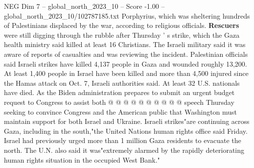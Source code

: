 \begin{textsample}{NEG Dim 7 – global\_north\_2023\_10 – Score -1.00 – global\_north\_2023\_10/102787185.txt}
Porphyrius, which was sheltering hundreds of Palestinians displaced by the war, according to religious officials. \textbf{Rescuers} were still digging through the rubble after Thursday ' s strike, which the Gaza health ministry said killed at least 16 Christians.
The Israeli military said it was aware of reports of casualties and was reviewing the incident.
Palestinian officials said Israeli strikes have killed 4,137 people in Gaza and wounded roughly 13,200.
At least 1,400 people in Israel have been killed and more than 4,500 injured since the Hamas attack on Oct. 7, Israeli authorities said.
At least 32 U.S. nationals have died.
As the Biden administration prepares to submit an urgent budget request to Congress to assist both @ @ @ @ @ @ @ @ @ @ speech Thursday seeking to convince Congress and the American public that Washington must maintain support for both Israel and Ukraine.
Israeli strikes"are continuing across Gaza, including in the south,"the United Nations human rights office said Friday.
Israel had previously urged more than 1 million Gaza residents to evacuate the north.
The U.N. also said it was"extremely alarmed by the rapidly deteriorating human rights situation in the occupied West Bank."

\end{textsample}
